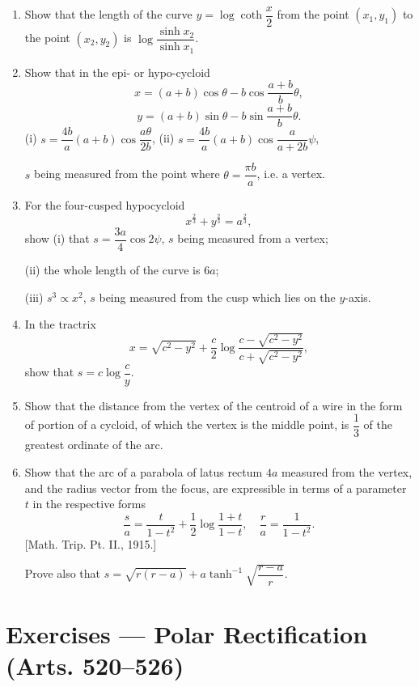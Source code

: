 \documentclass[11pt, a4paper]{article}
\newcommand{\source}[1]{\hfill\textnormal{[#1]}}
\begin{document}
\begin{enumerate}[leftmargin=2em]
\item Show that the length of the curve $y=\log\coth\dfrac{x}{2}$ from the point $(x_1,y_1)$ to the point $(x_2,y_2)$ is $\log\dfrac{\sinh x_2}{\sinh x_1}$.

\item Show that in the epi- or hypo-cycloid
\[
x=(a+b)\cos\theta-b\cos\frac{a+b}{b}\theta,
\]
\[
y=(a+b)\sin\theta-b\sin\frac{a+b}{b}\theta.
\]
(i) $s=\dfrac{4b}{a}(a+b)\cos\dfrac{a\theta}{2b}$,   (ii) $s=\dfrac{4b}{a}(a+b)\cos\dfrac{a}{a+2b}\psi$,

$s$ being measured from the point where $\theta=\dfrac{\pi b}{a}$, i.e. a vertex.

\item For the four-cusped hypocycloid
\[
x^{\frac23}+y^{\frac23}=a^{\frac23},
\]
show (i) that $s=\dfrac{3a}{4}\cos2\psi$, $s$ being measured from a vertex;

(ii) the whole length of the curve is $6a$;

(iii) $s^3\propto x^2$, $s$ being measured from the cusp which lies on the $y$-axis.

\item In the tractrix
\[
x=\sqrt{c^2-y^2}+\frac{c}{2}\log\frac{c-\sqrt{c^2-y^2}}{c+\sqrt{c^2-y^2}},
\]
show that $s=c\log\dfrac{c}{y}$.

\item Show that the distance from the vertex of the centroid of a wire in the form of portion of a cycloid, of which the vertex is the middle point, is $\dfrac13$ of the greatest ordinate of the arc.

\item Show that the arc of a parabola of latus rectum $4a$ measured from the vertex, and the radius vector from the focus, are expressible in terms of a parameter $t$ in the respective forms
\[
\frac{s}{a}=\frac{t}{1-t^2}+\frac12\log\frac{1+t}{1-t},\quad \frac{r}{a}=\frac{1}{1-t^2}.
\]
\source{Math. Trip. Pt. II., 1915.}

Prove also that $s=\sqrt{r(r-a)}+a\tanh^{-1}\sqrt{\dfrac{r-a}{r}}$.

\end{enumerate}

\section*{Exercises --- Polar Rectification (Arts. 520--526)}
\end{document}
